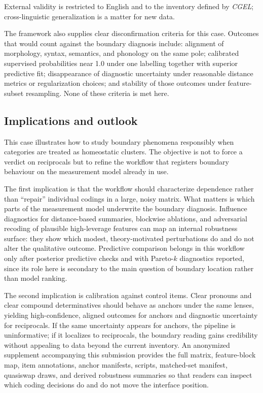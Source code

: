 \documentclass[12pt]{article}
\begin{document}
External validity is restricted to English and to the inventory defined by \textit{CGEL}; cross-linguistic generalization is a matter for new data.

The framework also supplies clear disconfirmation criteria for this case. Outcomes that would count against the boundary diagnosis include: alignment of morphology, syntax, semantics, and phonology on the same pole; calibrated supervised probabilities near 1.0 under one labelling together with superior predictive fit; disappearance of diagnostic uncertainty under reasonable distance metrics or regularization choices; and stability of those outcomes under feature-subset resampling. None of these criteria is met here.

\subsection{Implications and outlook}

This case illustrates how to study boundary phenomena responsibly when categories are treated as homeostatic clusters. The objective is not to force a verdict on reciprocals but to refine the workflow that registers boundary behaviour on the measurement model already in use.

The first implication is that the workflow should characterize dependence rather than \enquote{repair} individual codings in a large, noisy matrix. What matters is which parts of the measurement model underwrite the boundary diagnosis. Influence diagnostics for distance-based summaries, blockwise ablations, and adversarial recoding of plausible high-leverage features can map an internal robustness surface: they show which modest, theory-motivated perturbations do and do not alter the qualitative outcome. Predictive comparison belongs in this workflow only after posterior predictive checks and with Pareto-$k$ diagnostics reported, since its role here is secondary to the main question of boundary location rather than model ranking.

The second implication is calibration against control items. Clear pronouns and clear compound determinatives should behave as anchors under the same lenses, yielding high-confidence, aligned outcomes for anchors and diagnostic uncertainty for reciprocals. If the same uncertainty appears for anchors, the pipeline is uninformative; if it localizes to reciprocals, the boundary reading gains credibility without appealing to data beyond the current inventory. An anonymized supplement accompanying this submission provides the full matrix, feature-block map, item annotations, anchor manifests, scripts, matched-set manifest, quasiswap draws, and derived robustness summaries so that readers can inspect which coding decisions do and do not move the interface position.
\end{document}
